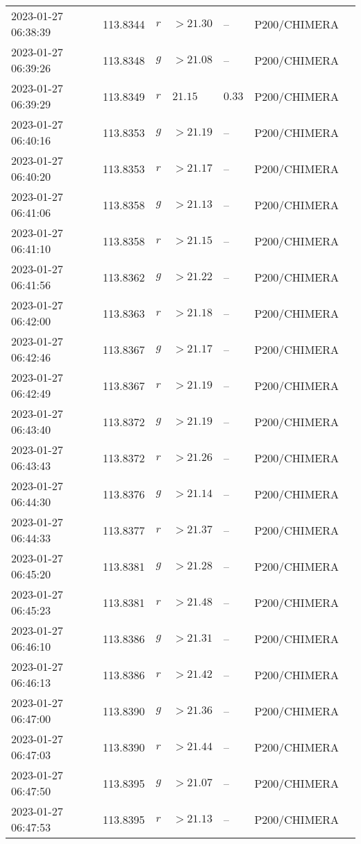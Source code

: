 \documentclass{nature_plusfigure}
\begin{document}
\begin{supplement}
\begin{center}
\begin{longtable}{lllllll}
2023-01-27 06:38:39 & 113.8344 & $r$ & $>21.30$ & -- & P200/CHIMERA &  \\ 
2023-01-27 06:39:26 & 113.8348 & $g$ & $>21.08$ & -- & P200/CHIMERA &  \\ 
2023-01-27 06:39:29 & 113.8349 & $r$ & $21.15$ & $0.33$ & P200/CHIMERA &  \\ 
2023-01-27 06:40:16 & 113.8353 & $g$ & $>21.19$ & -- & P200/CHIMERA &  \\ 
2023-01-27 06:40:20 & 113.8353 & $r$ & $>21.17$ & -- & P200/CHIMERA &  \\ 
2023-01-27 06:41:06 & 113.8358 & $g$ & $>21.13$ & -- & P200/CHIMERA &  \\ 
2023-01-27 06:41:10 & 113.8358 & $r$ & $>21.15$ & -- & P200/CHIMERA &  \\ 
2023-01-27 06:41:56 & 113.8362 & $g$ & $>21.22$ & -- & P200/CHIMERA &  \\ 
2023-01-27 06:42:00 & 113.8363 & $r$ & $>21.18$ & -- & P200/CHIMERA &  \\ 
2023-01-27 06:42:46 & 113.8367 & $g$ & $>21.17$ & -- & P200/CHIMERA &  \\ 
2023-01-27 06:42:49 & 113.8367 & $r$ & $>21.19$ & -- & P200/CHIMERA &  \\ 
2023-01-27 06:43:40 & 113.8372 & $g$ & $>21.19$ & -- & P200/CHIMERA &  \\ 
2023-01-27 06:43:43 & 113.8372 & $r$ & $>21.26$ & -- & P200/CHIMERA &  \\ 
2023-01-27 06:44:30 & 113.8376 & $g$ & $>21.14$ & -- & P200/CHIMERA &  \\ 
2023-01-27 06:44:33 & 113.8377 & $r$ & $>21.37$ & -- & P200/CHIMERA &  \\ 
2023-01-27 06:45:20 & 113.8381 & $g$ & $>21.28$ & -- & P200/CHIMERA &  \\ 
2023-01-27 06:45:23 & 113.8381 & $r$ & $>21.48$ & -- & P200/CHIMERA &  \\ 
2023-01-27 06:46:10 & 113.8386 & $g$ & $>21.31$ & -- & P200/CHIMERA &  \\ 
2023-01-27 06:46:13 & 113.8386 & $r$ & $>21.42$ & -- & P200/CHIMERA &  \\ 
2023-01-27 06:47:00 & 113.8390 & $g$ & $>21.36$ & -- & P200/CHIMERA &  \\ 
2023-01-27 06:47:03 & 113.8390 & $r$ & $>21.44$ & -- & P200/CHIMERA &  \\ 
2023-01-27 06:47:50 & 113.8395 & $g$ & $>21.07$ & -- & P200/CHIMERA &  \\ 
2023-01-27 06:47:53 & 113.8395 & $r$ & $>21.13$ & -- & P200/CHIMERA &  \\ 

\end{longtable}
\end{center}
\end{supplement}
\end{document}
